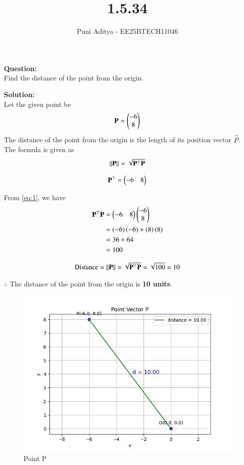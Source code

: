 \documentclass[journal]{IEEEtran}
\begin{document}
\title{1.5.34}
\author{Puni Aditya - EE25BTECH11046}
\maketitle

\textbf{Question:}\\
Find the distance of the point  from the origin.

\textbf{Solution:}\\
Let the given point be
\begin{align*}
    \mathbf{P} = \begin{pmatrix}-6 \\ 8\end{pmatrix}
\end{align*}
The distance of the point from the origin is the length of its position vector $\vec{P}$. The formula is given as 
\begin{align}
\left\lVert\mathbf{P}\right\rVert = \sqrt{\mathbf{P}^\top \mathbf{P}} \label{eq:1}
\end{align}

\begin{align*}
    \mathbf{P}^\top = \begin{pmatrix}-6 & 8\end{pmatrix}
\end{align*}

From \ref{eq:1}, we have
\begin{align}
    \mathbf{P}^\top \mathbf{P} &= \begin{pmatrix}-6 & 8\end{pmatrix} \begin{pmatrix}-6 \\ 8\end{pmatrix} \\
    &= \left(-6\right)\left(-6\right) + \left(8\right)\left(8\right) \\
    &= 36 + 64 \\
    &= 100
\end{align}

\begin{align*}
    \text{Distance} = \left\lVert\mathbf{P}\right\rVert = \sqrt{\mathbf{P}^\top \mathbf{P}} = \sqrt{100} = 10
\end{align*}

$\therefore$ The distance of the point  from the origin is \textbf{10 units}.

\begin{figure}
    \centering
    \includegraphics[width=0.5\columnwidth]{figs/plot_c.jpg}
    \caption*{Point P}
    \label{fig:fig}
\end{figure}
\end{document}

